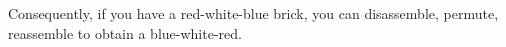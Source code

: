 Consequently, if you have a red-white-blue brick, you can disassemble, permute, reassemble to obtain a blue-white-red.
\begin{comment}
\begin{equation}
  \label{eq:recipe-full}
  \prftree{\prftree{\prftree{\legob{red1-white1-blue1}}{\legob{red1}\quad\legob{white1}\quad \legob{blue1}}}{\legob{blue1} \quad \legob{red1}\quad \legob{white1}}}{\legob{blue1-red1-white1}}
\end{equation}



The recipe before contains several concrete steps to go from the initial ingredient to the final result.
If we do not care about the detailed steps, we can summarize the recipe as follows, by eliding the intermediate steps and only remember the ingredient and the results.
\begin{equation}\label{eq:recipe-theorem}
\prftree{\legob{red1-white1-blue1}}{\legob{blue1-red1-white1}}
\end{equation}

Alternatively, you can think of \cref{eq:recipe-theorem} as the statement of a theorem, and of \cref{eq:recipe-full} as the proof of the theorem.

Sometimes we want to think about the transformations that are reversible.
For example, we can assemble 3 red bricks into a red-red-red brick:

\begin{equation}
\prftree{\legob{red1}}{\legob{red1}}{\legob{red1}}{\legob{red1-red1-red1}}
\end{equation}

We can also do the opposite:

\begin{equation}
\prftree{\legob{red1-red1-red1}}{\legob{red1}\quad\legob{red1}\quad\legob{red1}}
\end{equation}

To describe the bidirectionality, we use a double line:

\begin{equation}
\prftree[double]{\legob{red1}}{\legob{red1}}{\legob{red1}}{\legob{red1-red1-red1}}
\end{equation}

The flat pieces of Lego we have looked are actually one third shorter than a ``regular'' piece.

\begin{equation}
  \legob{red1} \qquad \legob{red1-red1}  \qquad \legob{red1-red1-red1} \qquad \legob{red3}
\end{equation}


\end{comment}
